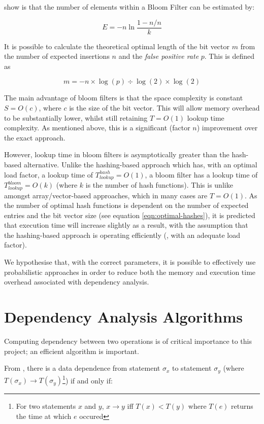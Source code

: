 		\citet{Swamidass2007} show is that the number of elements within a Bloom Filter can be estimated by:
		
		\[
		E = -n \ln \frac{1-n/n}{k}
		\]
		
		
		It is possible to calculate the theoretical optimal length of the bit vector $m$ from the number of expected insertions $n$ and the \textit{false positive rate} $p$. This is defined as

		\[
			m = -n \times \log(p) \div \log(2) \times \log(2)
		\]
		
		The main advantage of bloom filters is that the space complexity is constant $S=O(c)$, where $c$ is the size of the bit vector. This will allow memory overhead to be substantially lower, whilst still retaining $T=O(1)$ lookup time complexity. As mentioned above, this is a significant (factor $n$) improvement over the exact approach.
		
		However, lookup time in bloom filters is asymptotically greater than the hash-based alternative. Unlike the hashing-based approach which has, with an optimal load factor, a lookup time of $T_{lookup}^{hash}=O(1)$, a bloom filter has a lookup time of $T_{lookup}^{bloom}=O(k)$ (where $k$ is the number of hash functions). This is unlike amongst array/vector-based approaches, which in many cases are $T=O(1)$. As the number of optimal hash functions is dependent on the number of expected entries and the bit vector size (see equation \ref{eqn:optimal-hashes}), it is predicted that execution time will increase slightly as a result, with the assumption that the hashing-based approach is operating efficiently (\ie, with an adequate load factor).
		
		We hypothesise that, with the correct parameters, it is possible to effectively use probabilistic approaches in order to reduce both the memory and execution time overhead associated with dependency analysis.

\section{Dependency Analysis Algorithms} \label{sec:runtime/analysis}
	Computing dependency between two operations is of critical importance to this project; an efficient algorithm is important.
	
	From \citet[p.~37]{Allen2000}, there is a data dependence from statement $\sigma_x$ to statement $\sigma_y$ (where $T(\sigma_x) \rightarrow T(\sigma_y)$\footnote{For two statements $x$ and $y$, $x \rightarrow y$ iff $T(x) < T(y)$ where $T(e)$ returns the time at which $e$ occured}) if and only if:
	

